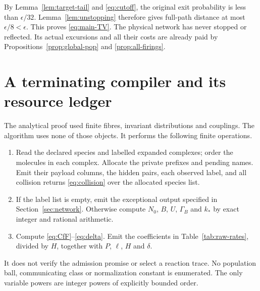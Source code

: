 \documentclass[11pt,reqno]{amsart}
\theoremstyle{definition}
\theoremstyle{remark}
\begin{document}
By Lemma~\ref{lem:target-tail} and \eqref{eq:cutoff}, the original exit
probability is less than $\epsilon/32$. Lemma~\ref{lem:unstopping} therefore
gives full-path distance at most $\epsilon/8<\epsilon$. This proves
\eqref{eq:main-TV}. The physical network has never stopped or reflected.
Its actual excursions and all their costs are already paid by
Propositions~\ref{prop:global-pop} and \ref{prop:all-firings}.

\section{A terminating compiler and its resource ledger}\label{sec:compiler}
The analytical proof used finite fibres, invariant distributions and couplings.
The algorithm uses none of those objects. It performs the following finite
operations.
\begin{enumerate}
\item Read the declared species and labelled expanded complexes; order the
molecules in each complex. Allocate the private prefixes and pending names.
Emit their payload columns, the hidden pairs, each observed label, and all
collision returns \eqref{eq:collision} over the allocated species list.
\item If the label list is empty, emit the exceptional output specified in
Section~\ref{sec:network}. Otherwise compute $N_0$, $B$, $U$, $\Gamma_B$ and
$k_*$ by exact integer and rational arithmetic.
\item Compute \eqref{eq:CfF}--\eqref{eq:delta}. Emit the coefficients in
Table~\ref{tab:raw-rates}, divided by $H$, together with $P$, $\ell$, $H$ and
$\delta$.
\end{enumerate}
It does not verify the admission promise or select a reaction trace. No
population ball, communicating class or normalization constant is enumerated.
The only variable powers are integer powers of explicitly bounded order.
\end{document}
